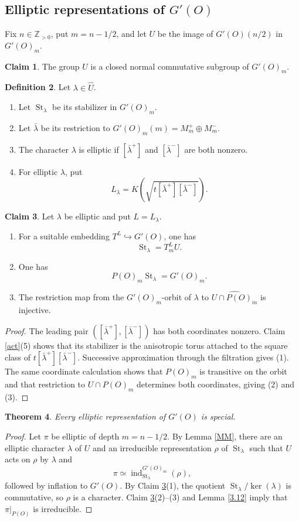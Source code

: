 \documentclass[11pt,a4paper,twoside]{amsart}
\newtheorem{theorem}{Theorem}[section]
\theoremstyle{definition}
\newtheorem{definition}[theorem]{Definition}
\newtheorem{claim}[theorem]{Claim}
\theoremstyle{remark}
\newcommand{\ho}{\hookrightarrow}
\newcommand{\bl}{\lambda}
\newcommand{\ZZ}{\mathbb Z}
\newcommand{\ind}{\operatorname{ind}}
\newcommand{\St}{\operatorname{St}}
\begin{document}
\subsection{Elliptic representations of $G'(O)$}
Fix $n\in\ZZ_{>0}$, put $m=n-1/2$, and let $U$ be the image of $G'(O)(n/2)$ in $G'(O)_m$.
\begin{claim}\label{Gprime-U}
The group $U$ is a closed normal commutative subgroup of $G'(O)_m$.
\end{claim}
\begin{definition}\label{c}
Let $\bl\in\widehat U$.
\begin{enumerate}
\item Let $\St_\bl$ be its stabilizer in $G'(O)_m$.
\item Let $\bar\bl$ be its restriction to $G'(O)_m(m)=M_m^+\oplus M_m^-$.
\item The character $\bl$ is elliptic if $[\bar\bl^+]$ and $[\bar\bl^-]$ are both nonzero.
\item For elliptic $\bl$, put
$$
L_\bl=K\left(\sqrt{t[\bar\bl^+][\bar\bl^-]}\right).
$$
\end{enumerate}
\end{definition}
\begin{claim}\label{ch}
Let $\bl$ be elliptic and put $L=L_\bl$.
\begin{enumerate}
\item For a suitable embedding $T^L\ho G'(O)$, one has
$$
\St_\bl=T^L_mU.
$$
\item One has
$$
P(O)_m\St_\bl=G'(O)_m.
$$
\item The restriction map from the $G'(O)_m$-orbit of $\bl$ to $\widehat{U\cap P(O)_m}$ is injective.
\end{enumerate}
\end{claim}
\begin{proof}
The leading pair $([\bar\bl^+],[\bar\bl^-])$ has both coordinates nonzero. Claim \ref{act}(5) shows that its stabilizer is the anisotropic torus attached to the square class of $t[\bar\bl^+][\bar\bl^-]$. Successive approximation through the filtration gives (1). The same coordinate calculation shows that $P(O)_m$ is transitive on the orbit and that restriction to $U\cap P(O)_m$ determines both coordinates, giving (2) and (3).
\end{proof}
\begin{theorem}\label{char}
Every elliptic representation of $G'(O)$ is special.
\end{theorem}
\begin{proof}
Let $\pi$ be elliptic of depth $m=n-1/2$. By Lemma \ref{MM}, there are an elliptic character $\bl$ of $U$ and an irreducible representation $\rho$ of $\St_\bl$ such that $U$ acts on $\rho$ by $\bl$ and
$$
\pi\simeq\ind_{\St_\bl}^{G'(O)_m}(\rho),
$$
followed by inflation to $G'(O)$. By Claim \ref{ch}(1), the quotient $\St_\bl/\ker(\bl)$ is commutative, so $\rho$ is a character. Claim \ref{ch}(2)--(3) and Lemma \ref{3.12} imply that $\pi|_{P(O)}$ is irreducible.
\end{proof}
\end{document}
